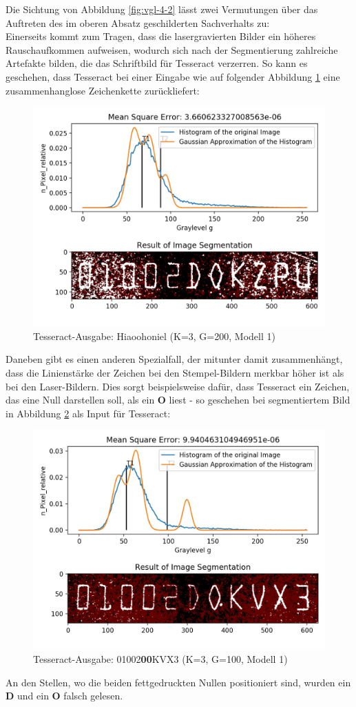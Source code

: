 			Die Sichtung von Abbildung \ref{fig:vgl-4-2} lässt zwei Vermutungen über das Auftreten des im oberen Absatz geschilderten Sachverhalts zu: \\
			Einerseits kommt zum Tragen, dass die lasergravierten Bilder ein höheres Rauschaufkommen aufweisen, wodurch sich nach der Segmentierung zahlreiche Artefakte bilden, die das Schriftbild für Tesseract verzerren. So kann es geschehen, dass Tesseract bei einer Eingabe wie auf folgender Abbildung \ref{fig:tesseract-fail} eine zusammenhanglose Zeichenkette zurückliefert:
			\begin{figure}[H]
				\centering
				\includegraphics[width=0.7\linewidth]{tesseract-fail}
				\caption{Tesseract-Ausgabe: Hiaoohoniel (K=3, G=200, Modell 1)}
				\label{fig:tesseract-fail}
			\end{figure}
			Daneben gibt es einen anderen Spezialfall, der mitunter damit zusammenhängt, dass die Linienstärke der Zeichen bei den Stempel-Bildern merkbar höher ist als bei den Laser-Bildern. Dies sorgt beispielsweise dafür, dass Tesseract ein Zeichen, das eine Null darstellen soll, als ein \textbf{O} liest - so geschehen bei segmentiertem Bild in Abbildung \ref{fig:onechar-fail} als Input für Tesseract:
			\begin{figure}[H]
				\centering
				\includegraphics[width=0.7\linewidth]{onechar-fail}
				\caption{Tesseract-Ausgabe: 01002\textbf{00}KVX3 (K=3, G=100, Modell 1)}
				\label{fig:onechar-fail}
			\end{figure}
			An den Stellen, wo die beiden fettgedruckten Nullen positioniert sind, wurden ein \textbf{D} und ein \textbf{O} falsch gelesen.
